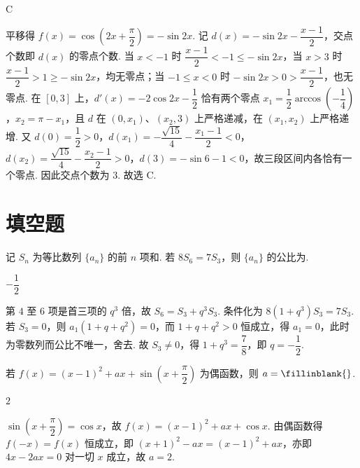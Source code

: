 \begin{answer}
C
\end{answer}

\begin{solution}
平移得 \(f(x)=\cos\left(2x+\dfrac{\pi}{2}\right)=-\sin2x\). 记 \(d(x)=-\sin2x-\dfrac{x-1}{2}\)，交点个数即 \(d(x)\) 的零点个数. 当 \(x<-1\) 时 \(\dfrac{x-1}{2}<-1\leqslant-\sin2x\)，当 \(x>3\) 时 \(\dfrac{x-1}{2}>1\geqslant-\sin2x\)，均无零点；当 \(-1\leqslant x<0\) 时 \(-\sin2x>0>\dfrac{x-1}{2}\)，也无零点. 在 \([0,3]\) 上，\(d'(x)=-2\cos2x-\dfrac12\) 恰有两个零点 \(x_1=\dfrac12\arccos\left(-\dfrac14\right)\)，\(x_2=\pi-x_1\)，且 \(d\) 在 \((0,x_1)\)、\((x_2,3)\) 上严格递减，在 \((x_1,x_2)\) 上严格递增. 又 \(d(0)=\dfrac12>0\)，\(d(x_1)=-\dfrac{\sqrt{15}}{4}-\dfrac{x_1-1}{2}<0\)，\(d(x_2)=\dfrac{\sqrt{15}}{4}-\dfrac{x_2-1}{2}>0\)，\(d(3)=-\sin6-1<0\)，故三段区间内各恰有一个零点. 因此交点个数为 \(3\). 故选 C.
\end{solution}

\section{填空题}

\begin{problem}
记 \(S_n\) 为等比数列 \(\{a_n\}\) 的前 \(n\) 项和. 若 \(8S_6=7S_3\)，则 \(\{a_n\}\) 的公比为\fillinblank{}.
\end{problem}

\begin{answer}
\(-\dfrac{1}{2}\)
\end{answer}

\begin{solution}
第 \(4\) 至 \(6\) 项是首三项的 \(q^3\) 倍，故 \(S_6=S_3+q^3S_3\). 条件化为 \(8(1+q^3)S_3=7S_3\). 若 \(S_3=0\)，则 \(a_1(1+q+q^2)=0\)，而 \(1+q+q^2>0\) 恒成立，得 \(a_1=0\)，此时为零数列而公比不唯一，舍去. 故 \(S_3\ne0\)，得 \(1+q^3=\dfrac78\)，即 \(q=-\dfrac12\).
\end{solution}

\begin{problem}
若 \(f(x)=\left(x-1\right)^2+ax+\sin\left(x+\dfrac{\pi}{2}\right)\) 为偶函数，则 \(a=\fillinblank{}\).
\end{problem}

\begin{answer}
\(2\)
\end{answer}

\begin{solution}
\(\sin\left(x+\dfrac{\pi}{2}\right)=\cos x\)，故 \(f(x)=(x-1)^2+ax+\cos x\). 由偶函数得 \(f(-x)=f(x)\) 恒成立，即 \((x+1)^2-ax=(x-1)^2+ax\)，亦即 \(4x-2ax=0\) 对一切 \(x\) 成立，故 \(a=2\).
\end{solution}

